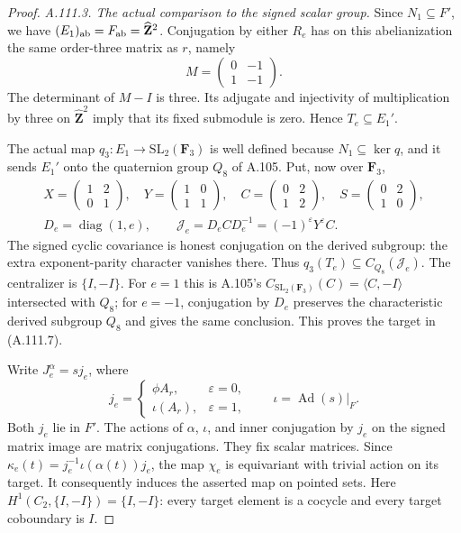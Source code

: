 \begin{proof}
\emph{A.111.3. The actual comparison to the signed scalar group.}
Since \(N_1\subseteq F'\), we have
\((E_1)_{\rm ab}=F_{\rm ab}=\widehat{\mathbf Z}^2\).
Conjugation by either \(R_e\) has on this abelianization the
same order-three matrix as \(r\), namely
\[
                  M=\begin{pmatrix}0&-1\\1&-1\end{pmatrix}.
\]
The determinant of \(M-I\) is three. Its adjugate and
injectivity of multiplication by three on
\(\widehat{\mathbf Z}^2\) imply that its fixed submodule
is zero. Hence \(T_e\subseteq E_1'\).

The actual map \(q_3:E_1\to\mathrm{SL}_2(\mathbf F_3)\)
is well defined because \(N_1\subseteq\ker q\), and it sends
\(E_1'\) onto the quaternion group \(Q_8\) of A.105.
Put, now over \(\mathbf F_3\),
\[
 \begin{gathered}
 X=\begin{pmatrix}1&2\\0&1\end{pmatrix},\quad
 Y=\begin{pmatrix}1&0\\1&1\end{pmatrix},\quad
 C=\begin{pmatrix}0&2\\1&2\end{pmatrix},\quad
 S=\begin{pmatrix}0&2\\1&0\end{pmatrix},\\
 D_e=\operatorname{diag}(1,e),\qquad
 \mathcal J_e=D_eCD_e^{-1}=(-1)^{\varepsilon}Y^{\varepsilon}C.
 \end{gathered}
\tag{A.111.13}
\]
The signed cyclic covariance is honest conjugation on the
derived subgroup: the extra exponent-parity character vanishes
there. Thus \(q_3(T_e)\subseteq C_{Q_8}(\mathcal J_e)\).
The centralizer is \(\{I,-I\}\). For \(e=1\) this is A.105's
\(C_{\mathrm{SL}_2(\mathbf F_3)}(C)=\langle C,-I\rangle\)
intersected with \(Q_8\); for \(e=-1\), conjugation by \(D_e\)
preserves the characteristic derived subgroup \(Q_8\) and gives
the same conclusion. This proves the target in (A.111.7).

Write \(J_e^{\alpha}=sj_e\), where
\[
 j_e=\begin{cases}\phi A_r,&\varepsilon=0,\\
 \iota(A_r),&\varepsilon=1,
 \end{cases}
 \qquad \iota=\operatorname{Ad}(s)|_F.
\tag{A.111.14}
\]
Both \(j_e\) lie in \(F'\). The actions of \(\alpha\),
\(\iota\), and inner conjugation by \(j_e\) on the signed
matrix image are matrix conjugations. They fix scalar matrices.
Since \(\kappa_e(t)=j_e^{-1}\iota(\alpha(t))j_e\), the map
\(\chi_e\) is equivariant with trivial action on its target.
It consequently induces the asserted map on pointed sets.
Here \(H^1(C_2,\{I,-I\})=\{I,-I\}\): every target element
is a cocycle and every target coboundary is \(I\).


\end{proof}

